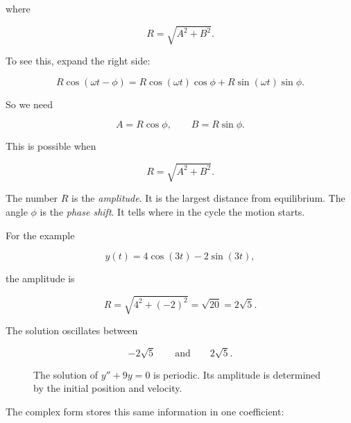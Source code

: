where

\[
R=\sqrt{A^2+B^2}.
\]

To see this, expand the right side:

\[
R\cos(\omega t-\phi)
=
R\cos(\omega t)\cos\phi+R\sin(\omega t)\sin\phi.
\]

So we need

\[
A=R\cos\phi,
\qquad
B=R\sin\phi.
\]

This is possible when

\[
R=\sqrt{A^2+B^2}.
\]

The number \(R\) is the \emph{amplitude}.  It is the largest distance from equilibrium.
The angle \(\phi\) is the \emph{phase shift}.  It tells where in the cycle the motion
starts.

For the example

\[
y(t)=4\cos(3t)-2\sin(3t),
\]

the amplitude is

\[
R=\sqrt{4^2+(-2)^2}=\sqrt{20}=2\sqrt5.
\]

The solution oscillates between

\[
-2\sqrt5
\qquad\text{and}\qquad
2\sqrt5.
\]

\begin{figure}[h]
\centering
{}
\caption{The solution of \(y''+9y=0\) is periodic.  Its amplitude is determined by the initial position and velocity.}
\label{fig:spring-solution-amplitude-phase}
\end{figure}

The complex form stores this same information in one coefficient:

